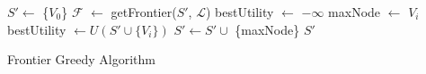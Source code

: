 \begin{algorithm}
  \begin{algorithmic}[1]
  \State $S' \gets$ \{$V_0$\}  
      \State $\mathcal{F}$ $\gets$ getFrontier($S'$, $\mathcal{L}$)
      \State bestUtility $\gets$ $-\infty$
      \State maxNode $\gets$ $V_i$
      \State bestUtility $\gets U(S' \cup \{V_i\})$
      \EndIf
      \EndFor
      \State $S' \gets S' \cup$ \{maxNode\}
  \EndWhile
  \Return $S'$
  \EndProcedure
  \end{algorithmic}
  \caption{Frontier Greedy Algorithm}\label{algo:frontier_greedy}
\end{algorithm}


